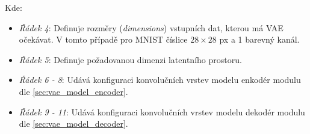 Kde:
\begin{itemize}
    \item \emph{Řádek 4}: Definuje rozměry (\emph{dimensions}) vstupních dat, kterou má VAE očekávat. V tomto případě pro MNIST číslice $28 \times 28$ px a 1 barevný kanál.
    \item \emph{Řádek 5}: Definuje požadovanou dimenzi latentního prostoru.
    \item \emph{Řádek 6 - 8}: Udává konfiguraci konvolučních vrstev modelu enkodér modulu dle \autoref{sec:vae_model_encoder}.
    \item \emph{Řádek 9 - 11}: Udává konfiguraci konvolučních vrstev modelu dekodér modulu dle \autoref{sec:vae_model_decoder}. 
\end{itemize}


